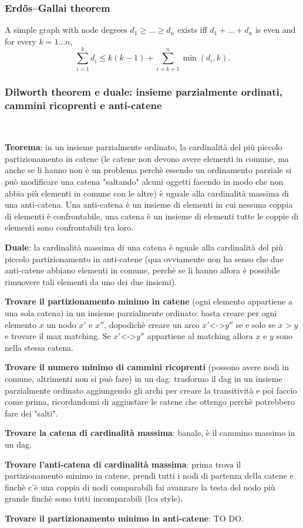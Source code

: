 \subsubsection{Erdős–Gallai theorem}
		A simple graph with node degrees $d_1 \ge \dots \ge d_n$ exists iff $d_1 + \dots + d_n$ is even and for every $k = 1\dots n$,
		\[ \sum _{i=1}^{k}d_{i}\leq k(k-1)+\sum _{i=k+1}^{n}\min(d_{i},k). \]

\subsubsection{Dilworth theorem e duale: insieme parzialmente ordinati, cammini ricoprenti e anti-catene}
\,

\textbf{Teorema}: in un insieme parzialmente ordinato, la cardinalità del più piccolo partizionamento in catene (le catene non devono avere elementi in comune, ma anche se li hanno 
non è un problema perchè essendo un ordinamento parziale si può modificare una catena  "saltando" alcuni oggetti facendo in modo che non abbia più elementi in comune con le altre) è
uguale alla cardinalità massima di una anti-catena. Una anti-catena è un insieme di elementi in cui nessuna coppia di elementi è confrontabile, una catena è un insieme di elementi 
tutte le coppie di elementi sono  confrontabili tra loro. 

\textbf{Duale}: la cardinalità massima di una catena è uguale alla cardinalità del più piccolo partizionamento in anti-catene (qua 
ovviamente non ha senso che due anti-catene abbiano elementi in comune, perchè se li hanno allora è possibile rimuovere tali elementi da uno dei due insiemi). 

\textbf{Trovare il partizionamento minimo in catene} (ogni elemento appartiene a una sola catena) in un insieme parzialmente ordinato: basta creare per ogni elemento $x$ un nodo $x'$ e $x''$, dopodichè creare un arco $x'$<->$y''$ se e solo se $x>y$ e trovare il max matching. Se
$x'$<->$y''$ appartiene al matching allora $x$ e $y$ sono nella stessa catena. 

\textbf{Trovare il numero minimo di cammini ricoprenti} (possono avere nodi in comune, altrimenti non si può fare) in un dag: trasformo il dag in un insieme parzialmente ordinato aggiungendo gli archi per creare la transitività e poi faccio come prima, ricordandomi di aggiustare le catene che ottengo perchè potrebbero fare dei "salti".

\textbf{Trovare la catena di cardinalità massima}: banale, è il cammino massimo in un dag. 

\textbf{Trovare l'anti-catena di cardinalità massima}: prima trova il partizionamento
minimo in catene, prendi tutti i nodi di partenza della catene e finchè c'è una coppia di nodi comparabili fai avanzare la testa del nodo più grande finchè sono tutti incomparabili (lca style).

\textbf{Trovare il partizionamento minimo in anti-catene}: TO DO. 
